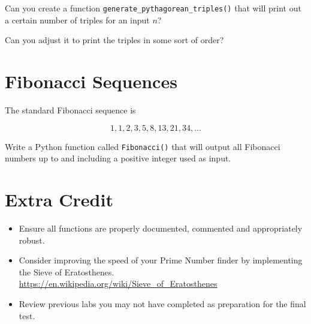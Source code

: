 \documentclass[12pt,oneside]{cttutorial}
\begin{document}
Can you create a function \lstinline!generate_pythagorean_triples()! that will print out a certain number of triples for an input $n$?

Can you adjust it to print the triples in some sort of order?

\section{Fibonacci Sequences}

The standard Fibonacci sequence is

\[
1,1,2,3,5,8,13,21,34, \ldots
\]

Write a Python function called \lstinline!Fibonacci()! that will output all Fibonacci numbers up to and including a positive integer used as input.


\section{Extra Credit}

\begin{itemize}
\item Ensure all functions are properly documented, commented and appropriately robust.

\item Consider improving the speed of your Prime Number finder by implementing the Sieve of Eratosthenes. \url{https://en.wikipedia.org/wiki/Sieve_of_Eratosthenes}

\item Review previous labs you may not have completed as preparation for the final test.
\end{itemize}
\end{document}
